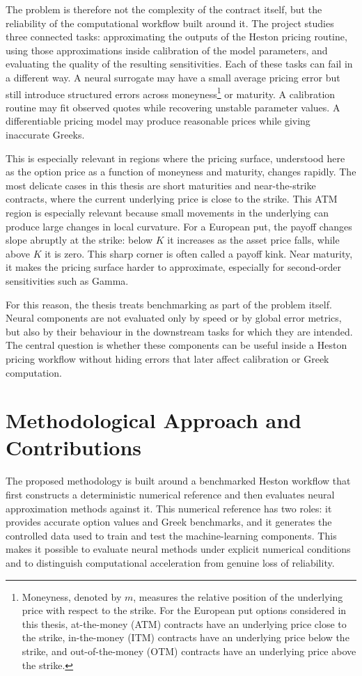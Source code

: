 The problem is therefore not the complexity of the contract itself, but the reliability of the computational workflow built around it. 
The project studies three connected tasks: approximating the outputs of the Heston pricing routine, using those approximations inside calibration of the model parameters, and evaluating the quality of the resulting sensitivities. 
Each of these tasks can fail in a different way.
A neural surrogate may have a small average pricing error but still introduce structured errors across moneyness\footnote{Moneyness, denoted by \(m\), measures the relative position of the underlying price with respect to the strike. For the European put options considered in this thesis, at-the-money (ATM) contracts have an underlying price close to the strike, in-the-money (ITM) contracts have an underlying price below the strike, and out-of-the-money (OTM) contracts have an underlying price above the strike.} or maturity. 
A calibration routine may fit observed quotes while recovering unstable parameter values. 
A differentiable pricing model may produce reasonable prices while giving inaccurate Greeks.

This is especially relevant in regions where the pricing surface, understood here as the option price as a function of moneyness and maturity, changes rapidly. 
The most delicate cases in this thesis are short maturities and near-the-strike contracts, where the current underlying price is close to the strike. 
This ATM region is especially relevant because small movements in the underlying can produce large changes in local curvature. 
For a European put, the payoff changes slope abruptly at the strike: below \(K\) it increases as the asset price falls, while above \(K\) it is zero. This sharp corner is often called a payoff kink. Near maturity, it makes the pricing surface harder to approximate, especially for second-order sensitivities such as Gamma.


For this reason, the thesis treats benchmarking as part of the problem itself. Neural components are not evaluated only by speed or by global error metrics, but also by their behaviour in the downstream tasks for which they are intended. The central question is whether these components can be useful inside a Heston pricing workflow without hiding errors that later affect calibration or Greek computation.


\section{Methodological Approach and Contributions}
The proposed methodology is built around a benchmarked Heston workflow that first constructs a deterministic numerical reference and then evaluates neural approximation methods against it. 
This numerical reference has two roles: it provides accurate option values and Greek benchmarks, and it generates the controlled data used to train and test the machine-learning components.
This makes it possible to evaluate neural methods under explicit numerical conditions and to distinguish computational acceleration from genuine loss of reliability.

